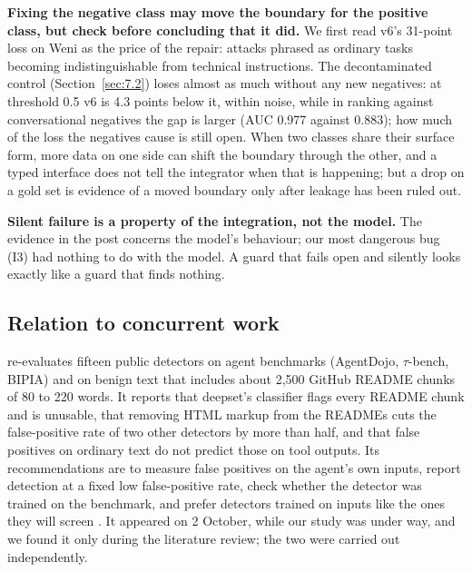 \documentclass[11pt]{article}
\begin{document}
\textbf{Fixing the negative class may move the boundary for the positive class, but check before concluding that it did.} We first read v6's 31-point loss on Weni as the price of the repair: attacks phrased as ordinary tasks becoming indistinguishable from technical instructions. The decontaminated control (Section~\ref{sec:7.2}) loses almost as much without any new negatives: at threshold 0.5 v6 is 4.3 points below it, within noise, while in ranking against conversational negatives the gap is larger (AUC 0.977 against 0.883); how much of the loss the negatives cause is still open. When two classes share their surface form, more data on one side can shift the boundary through the other, and a typed interface does not tell the integrator when that is happening; but a drop on a gold set is evidence of a moved boundary only after leakage has been ruled out.

\textbf{Silent failure is a property of the integration, not the model.} The evidence in the post concerns the model's behaviour; our most dangerous bug (I3) had nothing to do with the model. A guard that fails open and silently looks exactly like a guard that finds nothing.

\subsection{Relation to concurrent work}\label{sec:9.3}

\citet{liu2026passing} re-evaluates fifteen public detectors on agent benchmarks (AgentDojo, $\tau$-bench, BIPIA) and on benign text that includes about 2,500 GitHub README chunks of 80 to 220 words. It reports that deepset's classifier flags every README chunk and is unusable, that removing HTML markup from the READMEs cuts the false-positive rate of two other detectors by more than half, and that false positives on ordinary text do not predict those on tool outputs. Its recommendations are to measure false positives on the agent's own inputs, report detection at a fixed low false-positive rate, check whether the detector was trained on the benchmark, and prefer detectors trained on inputs like the ones they will screen%
. It appeared on 2 October, while our study was under way, and we found it only during the literature review; the two were carried out independently.
\end{document}

